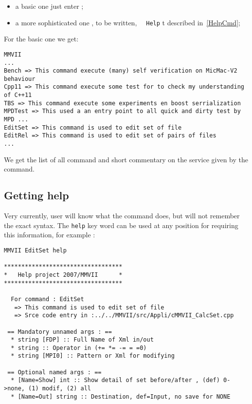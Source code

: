 \begin{itemize}
   \item  a basic one just enter  {\tt  \CdPPP};
   \item  a more sophisticated one , to be written,  {\tt  \CdPPP\, Help} t
          described in~\ref{HelpCmd};
\end{itemize}

For the basic one we get:

\begin{verbatim}
MMVII
... 
Bench => This command execute (many) self verification on MicMac-V2 behaviour
Cpp11 => This command execute some test for to check my understanding of C++11
TBS => This command execute some experiments en boost serrialization
MPDTest => This used a an entry point to all quick and dirty test by MPD ...
EditSet => This command is used to edit set of file
EditRel => This command is used to edit set of pairs of files
...
\end{verbatim}

We get the list of all command and short commentary on the service given by
the command.


\subsection{Getting help}

Very currently, user will know what the command does, but will not remember the exact syntax.
The {\tt help} key word can be used at any position for requiring this information,
for example :

\begin{verbatim}
MMVII EditSet help

**********************************
*   Help project 2007/MMVII      *
**********************************

  For command : EditSet 
   => This command is used to edit set of file
   => Srce code entry in :../../MMVII/src/Appli/cMMVII_CalcSet.cpp

 == Mandatory unnamed args : ==
  * string [FDP] :: Full Name of Xml in/out
  * string :: Operator in (+= *= -= = =0)
  * string [MPI0] :: Pattern or Xml for modifying

 == Optional named args : ==
  * [Name=Show] int :: Show detail of set before/after , (def) 0->none, (1) modif, (2) all
  * [Name=Out] string :: Destination, def=Input, no save for NONE
\end{verbatim}

